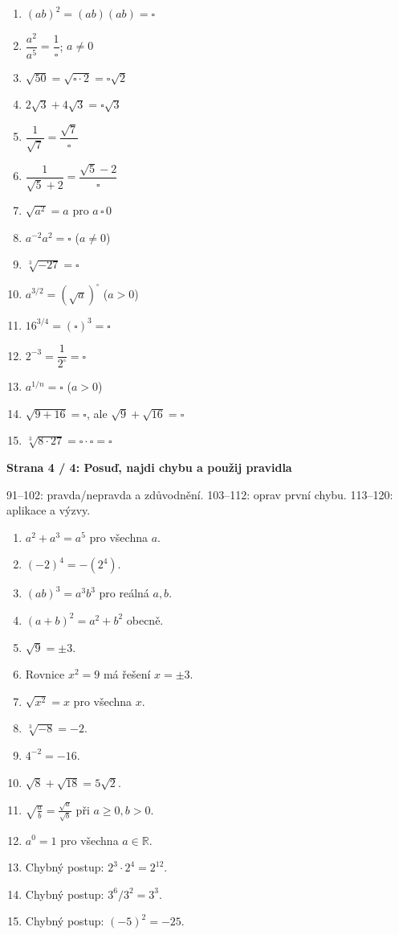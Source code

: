 \documentclass[11pt,a4paper]{article}
\newcommand{\studenthead}[2]{%
  {\large\bfseries #1}\par\vspace{1mm}
  {\footnotesize #2}\par\vspace{2.4mm}}
\begin{document}
\begin{minipage}[t]{.49\textwidth}
\begin{enumerate}[label=\textbf{\arabic*.},leftmargin=8mm,itemsep=11pt,topsep=3pt,start=76]
\normalsize
\item $(ab)^2=(ab)(ab)=\square$
\item $\dfrac{a^2}{a^5}=\dfrac1{\square}$; $a\ne0$
\item $\sqrt{50}=\sqrt{\square\cdot2}=\square\sqrt2$
\item $2\sqrt3+4\sqrt3=\square\sqrt3$
\item $\dfrac1{\sqrt7}=\dfrac{\sqrt7}{\square}$
\item $\dfrac1{\sqrt5+2}=\dfrac{\sqrt5-2}{\square}$
\item $\sqrt{a^2}=a$ pro $a\,\square\,0$
\item $a^{-2}a^2=\square$ ($a\ne0$)
\item $\sqrt[3]{-27}=\square$
\item $a^{3/2}=(\sqrt a)^{\square}$ ($a>0$)
\item $16^{3/4}=(\square)^3=\square$
\item $2^{-3}=\dfrac1{2^{\square}}=\square$
\item $a^{1/n}=\square$ ($a>0$)
\item $\sqrt{9+16}=\square$, ale $\sqrt9+\sqrt{16}=\square$
\item $\sqrt[3]{8\cdot27}=\square\cdot\square=\square$
\end{enumerate}
\end{minipage}
\clearpage
\studenthead{Strana 4 / 4: Posuď, najdi chybu a použij pravidla}{91--102: pravda/nepravda a zdůvodnění. 103--112: oprav první chybu. 113--120: aplikace a výzvy.}
\noindent\begin{minipage}[t]{.49\textwidth}
\begin{enumerate}[label=\textbf{\arabic*.},leftmargin=8mm,itemsep=11pt,topsep=3pt,start=91]
\normalsize
\item $a^2+a^3=a^5$ pro všechna $a$.
\item $(-2)^4=-(2^4)$.
\item $(ab)^3=a^3b^3$ pro reálná $a,b$.
\item $(a+b)^2=a^2+b^2$ obecně.
\item $\sqrt9=\pm3$.
\item Rovnice $x^2=9$ má řešení $x=\pm3$.
\item $\sqrt{x^2}=x$ pro všechna $x$.
\item $\sqrt[3]{-8}=-2$.
\item $4^{-2}=-16$.
\item $\sqrt8+\sqrt{18}=5\sqrt2$.
\item $\sqrt{\frac ab}=\frac{\sqrt a}{\sqrt b}$ při $a\ge0,b>0$.
\item $a^0=1$ pro všechna $a\in\mathbb R$.
\item Chybný postup: $2^3\cdot2^4=2^{12}$.
\item Chybný postup: $3^6/3^2=3^3$.
\item Chybný postup: $(-5)^2=-25$.
\end{enumerate}
\end{minipage}\hfill
\end{document}
